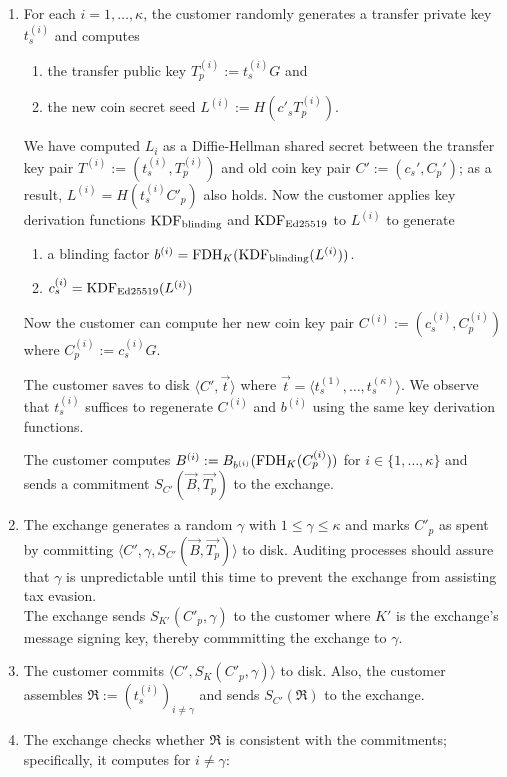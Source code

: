 \documentclass{llncs}
\begin{document}

\begin{enumerate}
\item %
    For each $i = 1,\ldots,\kappa$, the customer randomly generates
    a transfer private key $t^{(i)}_s$ and computes
    \begin{enumerate}
    \item the transfer public key $T^{(i)}_p := t^{(i)}_s G$ and
    \item the new coin secret seed $L^{(i)} := H(c'_s T_p^{(i)})$.
    \end{enumerate}
    We have computed $L_i$ as a Diffie-Hellman shared secret between
    the transfer key pair $T^{(i)} := \left(t^{(i)}_s,T^{(i)}_p\right)$
    and old coin key pair $C' := \left(c_s', C_p'\right)$;
    as a result, $L^{(i)} = H(t^{(i)}_s C'_p)$ also holds.
    Now the customer applies key derivation functions $\textrm{KDF}_{\textrm{blinding}}$ and $\textrm{KDF}_{\textrm{Ed25519}}$ to $L^{(i)}$ to generate
    \begin{enumerate}
      \item a blinding factor $b^{(i)} = \textrm{FDH}_K(\textrm{KDF}_{\textrm{blinding}}(L^{(i)}))$.
      \item $c_s^{(i)} = \textrm{KDF}_{\textrm{Ed25519}}(L^{(i)})$
    \end{enumerate}
    Now the customer can compute her new coin key pair
     $C^{(i)} := \left(c_s^{(i)}, C_p^{(i)}\right)$
     where $C^{(i)}_p := c^{(i)}_s G$.

    The customer saves to disk $\langle C', \vec{t}\rangle$ where
    $\vec{t} = \langle t^{(1)}_s, \ldots, t^{(\kappa)}_s \rangle$.
    We observe that $t^{(i)}_s$ suffices to regenerate $C^{(i)}$ and $b^{(i)}$
    using the same key derivation functions.

    The customer computes $B^{(i)} := B_{b^{(i)}}(\textrm{FDH}_K(C^{(i)}_p))$
    for $i \in \{1,\ldots,\kappa\}$ and sends a commitment
     $S_{C'}(\vec{B}, \vec{T_p})$ to the exchange.
  \item %
    The exchange generates a random $\gamma$ with $1 \le \gamma \le \kappa$ and
    marks $C'_p$ as spent by committing
    $\langle C', \gamma, S_{C'}(\vec{B}, \vec{T_p}) \rangle$ to disk.
    Auditing processes should assure that $\gamma$ is unpredictable until
    this time to prevent the exchange from assisting tax evasion. \\
    The exchange sends $S_{K'}(C'_p, \gamma)$ to the customer where
    $K'$ is the exchange's message signing key, thereby commmitting the exchange to $\gamma$.
  \item %
    The customer commits $\langle C', S_K(C'_p, \gamma) \rangle$ to disk.
    Also, the customer assembles
      $\mathfrak{R} := \left(t_s^{(i)}\right)_{i \ne \gamma}$
    and sends $S_{C'}(\mathfrak{R})$ to the exchange.
  \item %
    The exchange checks whether $\mathfrak{R}$ is consistent with
    the commitments; specifically, it computes for $i \not= \gamma$:


\end{enumerate}
\end{document}
